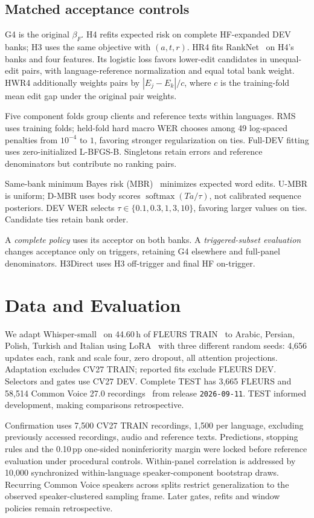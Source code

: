 \documentclass[conference,letterpaper]{IEEEtran}
\begin{document}
\subsection{Matched acceptance controls}
G4 is the original $\beta_F$. H4 refits expected risk on complete HF-expanded DEV banks; H3 uses the same objective with $(a,t,r)$. HR4 fits RankNet~\cite{ranknet2005} on H4's banks and four features. Its logistic loss favors lower-edit candidates in unequal-edit pairs, with language-reference normalization and equal total bank weight. HWR4 additionally weights pairs by $|E_j-E_k|/c$, where $c$ is the training-fold mean edit gap under the original pair weights.

Five component folds group clients and reference texts within languages. RMS uses training folds; held-fold hard macro WER chooses among 49 log-spaced penalties from $10^{-4}$ to $1$, favoring stronger regularization on ties. Full-DEV fitting uses zero-initialized L-BFGS-B. Singletons retain errors and reference denominators but contribute no ranking pairs.

Same-bank minimum Bayes risk (MBR)~\cite{goel2000mbr} minimizes expected word edits. U-MBR is uniform; D-MBR uses body scores $\operatorname{softmax}(Ta/\tau)$, not calibrated sequence posteriors. DEV WER selects $\tau\in\{0.1,0.3,1,3,10\}$, favoring larger values on ties. Candidate ties retain bank order.

A \emph{complete policy} uses its acceptor on both banks. A \emph{triggered-subset evaluation} changes acceptance only on triggers, retaining G4 elsewhere and full-panel denominators. H3Direct uses H3 off-trigger and final HF on-trigger.

\section{Data and Evaluation}
We adapt Whisper-small~\cite{whisper} on 44.60\,h of FLEURS TRAIN~\cite{fleurs} to Arabic, Persian, Polish, Turkish and Italian using LoRA~\cite{lora} with three different random seeds: 4,656 updates each, rank and scale four, zero dropout, all attention projections. Adaptation excludes CV27 TRAIN; reported fits exclude FLEURS DEV. Selectors and gates use CV27 DEV. Complete TEST has 3,665 FLEURS and 58,514 Common Voice 27.0 recordings~\cite{cv2020} from release \texttt{2026-09-11}. TEST informed development, making comparisons retrospective.

Confirmation uses 7,500 CV27 TRAIN recordings, 1,500 per language, excluding previously accessed recordings, audio and reference texts. Predictions, stopping rules and the 0.10\,pp one-sided noninferiority margin were locked before reference evaluation under procedural controls. Within-panel correlation is addressed by 10,000 synchronized within-language speaker-component bootstrap draws. Recurring Common Voice speakers across splits restrict generalization to the observed speaker-clustered sampling frame. Later gates, refits and window policies remain retrospective.
\end{document}
